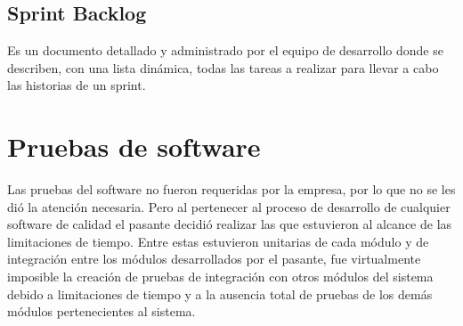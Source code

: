 \subsection{Sprint Backlog}
Es un documento detallado y administrado por el equipo de desarrollo donde se describen, con una lista dinámica, todas las tareas a realizar para llevar a cabo las historias de un sprint.

\section{Pruebas de software}

Las pruebas del software no fueron requeridas por la empresa, por lo que no se les dió la atención necesaria. Pero al pertenecer al proceso de desarrollo de cualquier software de calidad el pasante decidió realizar las que estuvieron al alcance de las limitaciones de tiempo. Entre estas estuvieron unitarias de cada módulo y de integración entre los módulos desarrollados por el pasante, fue virtualmente imposible la creación de pruebas de integración con otros módulos del sistema debido a limitaciones de tiempo y a la ausencia total de pruebas de los demás módulos pertenecientes al sistema.

